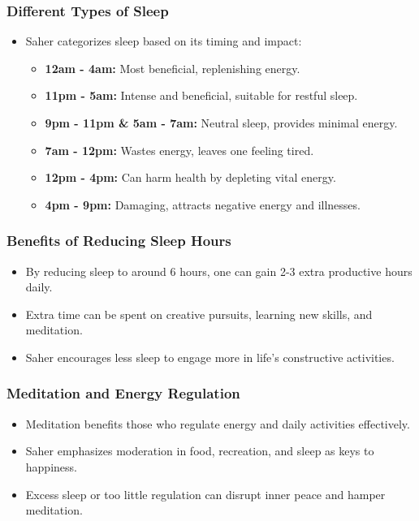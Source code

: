\begin{frame}[fragile]\frametitle{Different Types of Sleep}
    \begin{itemize}
        \item Saher categorizes sleep based on its timing and impact:
        \begin{itemize}
            \item \textbf{12am - 4am:} Most beneficial, replenishing energy.
            \item \textbf{11pm - 5am:} Intense and beneficial, suitable for restful sleep.
            \item \textbf{9pm - 11pm \& 5am - 7am:} Neutral sleep, provides minimal energy.
            \item \textbf{7am - 12pm:} Wastes energy, leaves one feeling tired.
            \item \textbf{12pm - 4pm:} Can harm health by depleting vital energy.
            \item \textbf{4pm - 9pm:} Damaging, attracts negative energy and illnesses.
        \end{itemize}
    \end{itemize}
\end{frame}

\begin{frame}[fragile]\frametitle{Benefits of Reducing Sleep Hours}
    \begin{itemize}
        \item By reducing sleep to around 6 hours, one can gain 2-3 extra productive hours daily.
        \item Extra time can be spent on creative pursuits, learning new skills, and meditation.
        \item Saher encourages less sleep to engage more in life's constructive activities.
    \end{itemize}
\end{frame}

\begin{frame}[fragile]\frametitle{Meditation and Energy Regulation}
    \begin{itemize}
        \item Meditation benefits those who regulate energy and daily activities effectively.
        \item Saher emphasizes moderation in food, recreation, and sleep as keys to happiness.
        \item Excess sleep or too little regulation can disrupt inner peace and hamper meditation.
    \end{itemize}
\end{frame}


